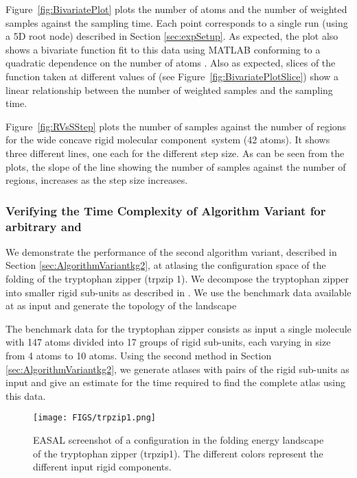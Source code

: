 \documentclass[]{article}
\newcommand{\figref}[1]{Figure~\ref{#1}}
\newcommand{\rmc}{rigid molecular component}
\begin{document}
\figref{fig:BivariatePlot} plots the number of atoms and the number of weighted
samples against the sampling time. Each point corresponds to a single run
(using a 5D root node) described in Section \ref{sec:expSetup}. As expected, the plot also
shows a bivariate function fit to this data using MATLAB conforming to a
quadratic dependence on the number of atoms . Also as expected, slices of
the function taken at different values of  (see
\figref{fig:BivariatePlotSlice}) show a linear relationship between the number
of weighted samples and the sampling time. 

\figref{fig:RVsSStep} plots the number of samples against the number of regions
for the wide concave \rmc\ system (42 atoms). It shows three different
lines, one each for the different step size. As can be seen from the plots, the
slope of the line showing the number of samples against
the number of regions, increases as the step size increases.

\subsubsection{Verifying the Time Complexity of Algorithm Variant for arbitrary  and }
\label{sec:results:variantComplexity}
We demonstrate the performance of the second algorithm variant, described in
Section \ref{sec:AlgorithmVariantkg2}, at atlasing the configuration space of
the folding of the tryptophan zipper (trpzip 1). We decompose the tryptophan
zipper into smaller rigid sub-units as described in \cite{joseph2017exploring,
kusumaatmaja2012local}. We use the benchmark data available at \cite{optmin} as
input and generate the topology of the landscape 

The benchmark data for the tryptophan zipper consists as input a single
molecule with 147 atoms divided into 17 groups of rigid sub-units, each varying
in size from 4 atoms to 10 atoms. Using the second method in Section
\ref{sec:AlgorithmVariantkg2}, we generate atlases with pairs of the rigid
sub-units as input and give an estimate for the time required to find the
complete atlas using this data.

\begin{figure}[htpb]
\centering
\texttt{[image: FIGS/trpzip1.png]}
\caption{EASAL screenshot of a configuration in the folding energy 
landscape of the tryptophan zipper (trpzip1). The different colors represent the 
different input rigid components.}
\label{fig:tryptophan}
\end{figure}
\end{document}
